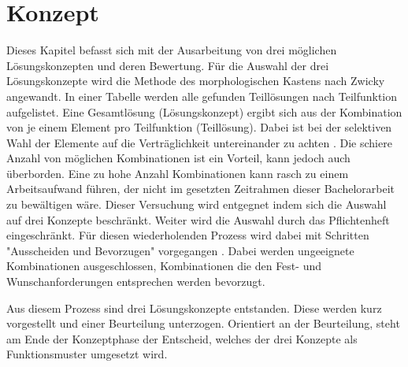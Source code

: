\newpage
\section{Konzept}
Dieses Kapitel befasst sich mit der Ausarbeitung von drei möglichen Lösungskonzepten und deren Bewertung. Für die Auswahl der drei Lösungskonzepte wird die Methode des morphologischen Kastens nach Zwicky angewandt. In einer Tabelle werden alle gefunden Teillösungen nach Teilfunktion aufgelistet. Eine Gesamtlösung (Lösungskonzept) ergibt sich aus der Kombination von je einem Element pro Teilfunktion (Teillösung). Dabei ist bei der selektiven Wahl der Elemente auf die Verträglichkeit untereinander zu achten \cite{naefe}.
\newline
Die schiere Anzahl von möglichen Kombinationen ist ein Vorteil, kann jedoch auch überborden. Eine zu hohe Anzahl Kombinationen kann rasch zu einem Arbeitsaufwand führen, der nicht im gesetzten Zeitrahmen dieser Bachelorarbeit zu bewältigen wäre. Dieser Versuchung wird entgegnet indem sich die Auswahl auf drei Konzepte beschränkt. Weiter wird die Auswahl durch das Pflichtenheft eingeschränkt. Für diesen wiederholenden Prozess wird dabei mit Schritten "Ausscheiden und Bevorzugen" vorgegangen \cite{naefe}. Dabei werden ungeeignete Kombinationen ausgeschlossen, Kombinationen die den Fest- und Wunschanforderungen entsprechen werden bevorzugt.

Aus diesem Prozess sind drei Lösungskonzepte entstanden. Diese werden kurz vorgestellt und einer Beurteilung unterzogen. Orientiert an der Beurteilung, steht am Ende der Konzeptphase der Entscheid, welches der drei Konzepte als Funktionsmuster umgesetzt wird.
